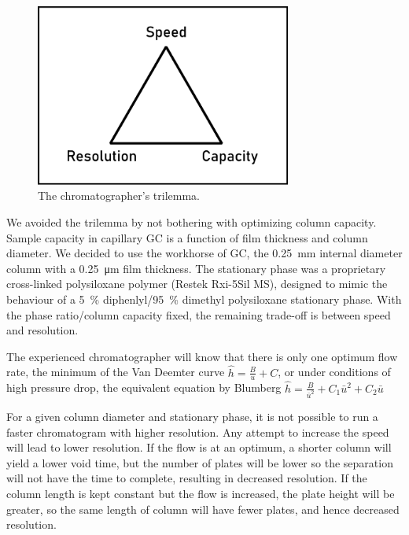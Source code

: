 \begin{figure}
\centering
\includegraphics[width=0.75\textwidth]{Figures/Triangle.pdf}
\decoRule
\caption[Schematic diagram of a the chromatograher's trilemma.]{The chromatographer's trilemma.}
\label{fig:trilemma}
\end{figure}

We avoided the trilemma by not bothering with optimizing column capacity. Sample
capacity in capillary GC is a function of film thickness and column diameter. We
decided to use the workhorse of GC, the \SI{0.25}{\milli\metre} internal
diameter column with a \SI{0.25}{\micro\metre} film thickness. The stationary
phase was a proprietary cross-linked polysiloxane polymer (Restek
Rxi\textregistered{}-5Sil MS), designed to mimic the behaviour of a
\SI{5}{\percent} diphenlyl/\SI{95}{\percent} dimethyl polysiloxane stationary
phase. With the phase ratio/column capacity fixed, the remaining trade-off is
between speed and resolution.

The experienced chromatographer will know that there is only one optimum flow
rate, the minimum of the Van Deemter curve \(\hat{h}=\frac{B}{u}+C\), or under
conditions of high pressure drop, the equivalent equation by Blumberg
\autocite{Blumberg1997} \(\hat{h}=\frac{B}{\bar{u}^2} + C_1\bar{u}^2 +
C_2\bar{u}\)

For a given column diameter and stationary phase, it is not possible to run a
faster chromatogram with higher resolution. Any attempt to increase the speed
will lead to lower resolution. If the flow is at an optimum, a shorter column
will yield a lower void time, but the number of plates will be lower so the
separation will not have the time to complete, resulting in decreased
resolution. If the column length is kept constant but the flow is increased, the
plate height will be greater, so the same length of column will have fewer
plates, and hence decreased resolution.

